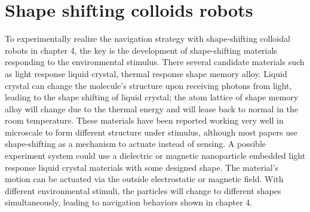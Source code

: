 \section{Shape shifting colloids robots}
To experimentally realize the navigation strategy with shape-shifting colloidal robots in chapter 4, the key is the development of shape-shifting materials responding to the environmental stimulus. There several candidate materials such as  light response liquid crystal\autocite{palagi2016structured}, thermal response shape memory alloy\autocite{busch1991shape}. Liquid crystal can change the molecule's structure upon receiving photons from  light, leading to the shape shifting of liquid crystal; the atom lattice of shape memory alloy will change due to the thermal energy and will lease back to normal in the room temperature. These materials have been reported working very well in microscale to form different structure under stimulus\autocite{breger2015self}, although most papers use shape-shifting as a mechanism to actuate instead of sensing\autocite{tu2017self,li2018light}. A possible experiment system could use a dielectric or magnetic nanoparticle embedded light response liquid crystal materials with some designed shape.   The material's motion can be actuated via the outside electrostatic or magnetic field. With different environmental stimuli, the particles will change to different shapes simultaneously, leading to navigation behaviors shown in chapter 4. 

